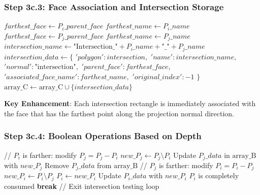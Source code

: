 \documentclass[12pt,a4paper]{article}
\begin{document}
\subsubsection{Step 3c.3: Face Association and Intersection Storage}

\begin{algorithm}
\caption{Face Association for Intersections}
\begin{algorithmic}[1]
    \STATE $farthest\_face \leftarrow P_i\_parent\_face$
    \STATE $farthest\_name \leftarrow P_i\_name$
\ELSE
    \STATE $farthest\_face \leftarrow P_j\_parent\_face$
    \STATE $farthest\_name \leftarrow P_j\_name$
\ENDIF
\STATE $intersection\_name \leftarrow \text{"Intersection\_"} + P_i\_name + \text{"\_"} + P_j\_name$
\STATE $intersection\_data \leftarrow \{$
\STATE \quad $'polygon': intersection,$
\STATE \quad $'name': intersection\_name,$
\STATE \quad $'normal': \text{"intersection"},$
\STATE \quad $'parent\_face': farthest\_face,$
\STATE \quad $'associated\_face\_name': farthest\_name,$
\STATE \quad $'original\_index': -1$
\STATE $\}$
\STATE $\text{array\_C} \leftarrow \text{array\_C} \cup \{intersection\_data\}$
\end{algorithmic}
\end{algorithm}

\textbf{Key Enhancement}: Each intersection rectangle is immediately associated with the face that has the farthest point along the projection normal direction.

\subsubsection{Step 3c.4: Boolean Operations Based on Depth}

\begin{algorithm}
\caption{Depth-Based Boolean Operations}
\begin{algorithmic}[1]
    \STATE // $P_i$ is farther: modify $P_j = P_j - P_i$
    \STATE $new\_P_j \leftarrow P_j \setminus P_i$
        \STATE Update $P_j\_data$ in $\text{array\_B}$ with $new\_P_j$
    \ELSE
        \STATE Remove $P_j\_data$ from $\text{array\_B}$
    \ENDIF
\ELSE
    \STATE // $P_j$ is farther: modify $P_i = P_i - P_j$
    \STATE $new\_P_i \leftarrow P_i \setminus P_j$
        \STATE $P_i \leftarrow new\_P_i$
        \STATE Update $P_i\_data$ with $new\_P_i$
    \ELSE
        \STATE $P_i$ is completely consumed
        \STATE \textbf{break} // Exit intersection testing loop
    \ENDIF
\ENDIF
\end{algorithmic}
\end{algorithm}
\end{document}
